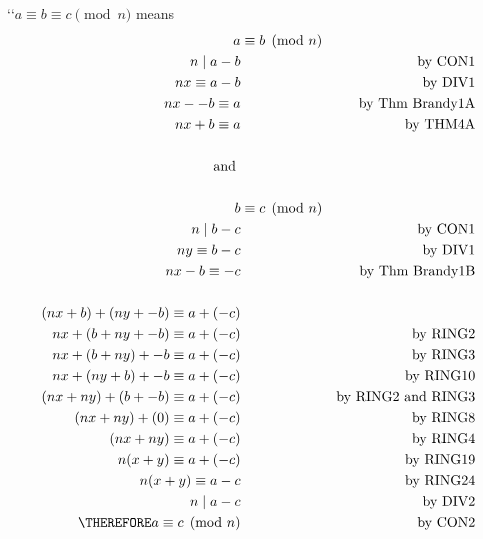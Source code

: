 
\lq\lq $a \equiv b \equiv c \pmod{n}$ means
\begin{align*}
a &\equiv b \pmod{n} \\
n \mid a-b && \text{by CON1} \\
nx \equiv a-b && \text{by DIV1} \\
nx - -b \equiv a && \text{by Thm Brandy1A}\\
nx + b \equiv a && \text{by THM4A}\\
\\
\text{ and } \\
\\
b &\equiv c \pmod{n} \\
n \mid b-c && \text{by CON1} \\
ny \equiv b-c && \text{by DIV1} \\
nx - b \equiv -c && \text{by Thm Brandy1B}\\
\\
(nx + b) + (ny + -b) \equiv a + (-c) \\
nx + (b + ny + -b) \equiv a + (-c) && \text{by RING2}\\
nx + (b + ny) + -b \equiv a + (-c) && \text{by RING3}\\
nx + (ny + b) + -b \equiv a + (-c) && \text{by RING10}\\
(nx + ny) + (b + -b) \equiv a + (-c) && \text{by RING2 and RING3}\\
(nx + ny) + (0) \equiv a + (-c) && \text{by RING8}\\
(nx + ny) \equiv a + (-c) && \text{by RING4}\\
n(x + y) \equiv a + (-c) && \text{by RING19}\\
n(x + y) \equiv a - c && \text{by RING24}\\
n \mid a - c  && \text{by DIV2}\\
\THEREFORE a \equiv c \pmod{n}  && \text{by CON2}\\
\end{align*}

